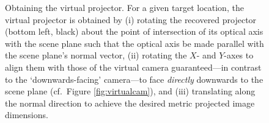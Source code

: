 \documentclass[review]{elsarticle}
\begin{document}
\begin{figure}
    \centering
    \qquad
    \caption{Obtaining the virtual projector. For a given target location, the virtual projector is obtained by (i) rotating the recovered projector (bottom left, black) about the point of intersection of its optical axis with the scene plane such that the optical axis be made parallel with the scene plane's normal vector, (ii) rotating the $X$- and $Y$-axes to align them with those of the virtual camera guaranteed---in contrast to the `downwards-facing' camera---to face \textit{directly} downwards to the scene plane (cf.\ Figure \ref{fig:virtualcam}), and (iii) translating along the normal direction to achieve the desired metric projected image dimensions.} %
    \label{fig:virtualproj}
\end{figure}
\end{document}
